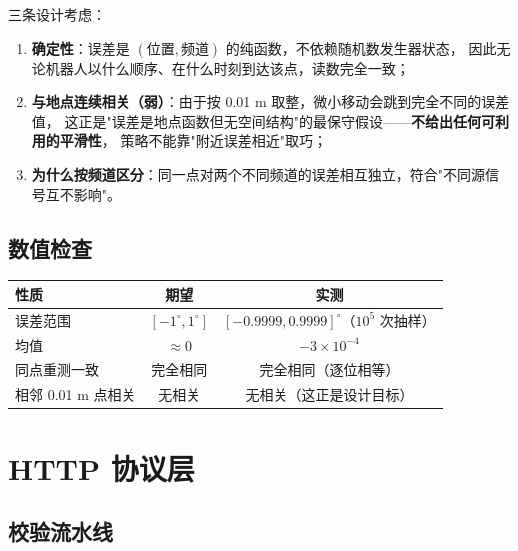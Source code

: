 三条设计考虑：
\begin{enumerate}[leftmargin=1.8em]
  \item \textbf{确定性}：误差是 $(\text{位置},\text{频道})$ 的纯函数，不依赖随机数发生器状态，
        因此无论机器人以什么顺序、在什么时刻到达该点，读数完全一致；
  \item \textbf{与地点连续相关（弱）}：由于按 0.01 m 取整，微小移动会跳到完全不同的误差值，
        这正是"误差是地点函数但无空间结构"的最保守假设——\textbf{不给出任何可利用的平滑性}，
        策略不能靠"附近误差相近"取巧；
  \item \textbf{为什么按频道区分}：同一点对两个不同频道的误差相互独立，符合"不同源信号互不影响"。
\end{enumerate}

\subsection{数值检查}

\begin{center}
\begin{tabular}{lcc}
\toprule
性质 & 期望 & 实测 \\ \midrule
误差范围 & $[-1^{\circ},1^{\circ}]$ & $[-0.9999,0.9999]^{\circ}$（$10^5$ 次抽样） \\
均值 & $\approx0$ & $-3\times10^{-4}$ \\
同点重测一致 & 完全相同 & 完全相同（逐位相等） \\
相邻 0.01 m 点相关 & 无相关 & 无相关（这正是设计目标） \\
\bottomrule
\end{tabular}
\end{center}

\section{HTTP 协议层}

\subsection{校验流水线}


